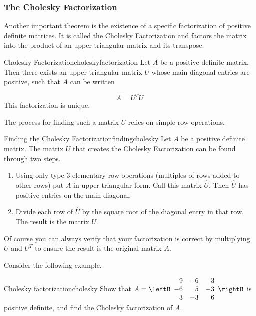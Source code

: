 \subsubsection{The Cholesky Factorization}

Another important theorem is the existence of a specific factorization of positive definite matrices. It is called the Cholesky Factorization and factors the matrix into the product of an upper triangular matrix and its transpose.

\begin{theorem}{Cholesky Factorization}{choleskyfactorization}
Let $A$ be a positive definite matrix. Then
there exists an upper triangular matrix $U$ whose main diagonal entries are positive, such that $A$ can be written

\begin{equation*}
A=
U^TU
\end{equation*}
This factorization is unique.
\end{theorem}

The process for finding such a matrix $U$ relies on simple row operations.

\begin{procedure}{Finding the Cholesky Factorization}{findingcholesky}
Let $A$ be a positive definite matrix. The matrix $U$ that creates the Cholesky Factorization can be found through two steps.
\begin{enumerate}
\item Using only type $3$ elementary row operations (multiples of rows added to other rows) put $A$ in upper triangular form. Call this matrix $\hat{U}$. Then $\hat{U}$ has positive entries on the main diagonal. 
\item Divide each row of $\hat{U}$ by the square root of the diagonal entry in that row. The result is the matrix $U$. 
\end{enumerate}
\end{procedure}

Of course you can always verify that your factorization is correct by multiplying $U$ and $U^T$ to ensure the result is the original matrix $A$. 

Consider the following example.

\begin{example}{Cholesky factorization}{cholesky}
Show that
$A=\leftB\begin{array}{rrr}
9 & -6 & 3 \\ -6 & 5 & -3 \\ 3 & -3 & 6 
\end{array}\rightB$ 
is positive definite, and find the Cholesky factorization of $A$.
\end{example}

